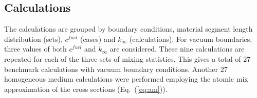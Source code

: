 \subsection{Calculations}
\label{sec:StochMedTrans-Calcs}

\noindent
	\indent The calculations are grouped by boundary conditions, material segment length distribution (sets),
	 ${c^{fuel}}$ (cases) and ${k_{\infty}}$ (calculations).  For vacuum boundaries, three values of both
	${c^{fuel}}$ and ${k_{\infty}}$ are considered.
	These nine calculations are repeated for each of the three sets of mixing statistics.  This gives a total of 27
	benchmark calculations with vacuum boundary conditions.  Another 27 homogeneous medium calculations
	were performed employing the atomic mix approximation of the cross sections (Eq.~(\ref{eq:am})).
	
